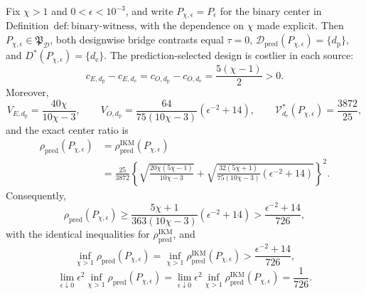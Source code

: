 Fix \(\chi>1\) and \(0<\epsilon<10^{-3}\), and write \(P_{\chi,\epsilon}=P_\epsilon\) for the binary center in Definition~\(\mathrm{def{:}binary\text{-}witness}\), with the dependence on \(\chi\) made explicit. Then \(P_{\chi,\epsilon}\in\mathfrak P_{\mathcal D}\), both designwise bridge contrasts equal \(\tau=0\), \(\mathcal D_{\mathrm{pred}}(P_{\chi,\epsilon})=\{d_{\mathrm p}\}\), and \(D^*(P_{\chi,\epsilon})=\{d_{\mathrm e}\}\). The prediction-selected design is costlier in each source:
\[
 c_{E,d_{\mathrm p}}-c_{E,d_{\mathrm e}}
 =c_{O,d_{\mathrm p}}-c_{O,d_{\mathrm e}}
 =\frac{5(\chi-1)}2>0.
\]
Moreover,
\[
 V_{E,d_{\mathrm p}}=\frac{40\chi}{10\chi-3},
 \qquad
 V_{O,d_{\mathrm p}}
 =\frac{64}{75(10\chi-3)}\left(\epsilon^{-2}+14\right),
 \qquad
 \mathcal V_{d_{\mathrm e}}^*(P_{\chi,\epsilon})=\frac{3872}{25},
\]
and the exact center ratio is
\[
\begin{aligned}
 \rho_{\mathrm{pred}}(P_{\chi,\epsilon})
 &=\rho_{\mathrm{pred}}^{\mathrm{IKM}}(P_{\chi,\epsilon})\\
 &=\frac{25}{3872}
 \left\{
 \sqrt{\frac{20\chi(5\chi-1)}{10\chi-3}}
 +\sqrt{\frac{32(5\chi+1)}{75(10\chi-3)}
 \left(\epsilon^{-2}+14\right)}
 \right\}^{2}.                                             \tag{1}
\end{aligned}
\]
Consequently,
\[
 \rho_{\mathrm{pred}}(P_{\chi,\epsilon})
 \ge
 \frac{5\chi+1}{363(10\chi-3)}
 \left(\epsilon^{-2}+14\right)
 >\frac{\epsilon^{-2}+14}{726},                            \tag{2}
\]
with the identical inequalities for \(\rho_{\mathrm{pred}}^{\mathrm{IKM}}\), and
\[
 \inf_{\chi>1}\rho_{\mathrm{pred}}(P_{\chi,\epsilon})
 =\inf_{\chi>1}\rho_{\mathrm{pred}}^{\mathrm{IKM}}(P_{\chi,\epsilon})
 >\frac{\epsilon^{-2}+14}{726},                            \tag{3}
\]
\[
 \lim_{\epsilon\downarrow0}\epsilon^2
 \inf_{\chi>1}\rho_{\mathrm{pred}}(P_{\chi,\epsilon})
 =\lim_{\epsilon\downarrow0}\epsilon^2
 \inf_{\chi>1}\rho_{\mathrm{pred}}^{\mathrm{IKM}}(P_{\chi,\epsilon})
 =\frac1{726}.                                             \tag{4}
\]